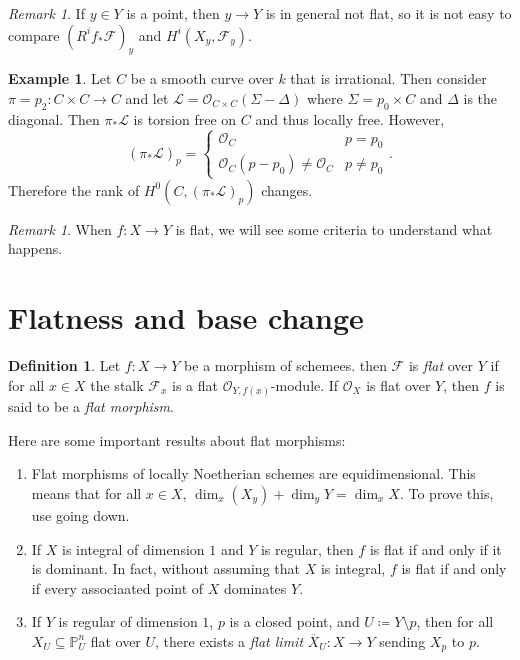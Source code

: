 \documentclass[leqno, openany]{memoir}
\theoremstyle{definition}
\newtheorem{defn}[thm]{Definition}
\newtheorem{exm}[thm]{Example}
\theoremstyle{remark}
\newtheorem{rmk}[thm]{Remark}
\theoremstyle{plain}
\theoremstyle{definition}
\theoremstyle{remark}
\renewcommand{\P}{\mathbb{P}}
\newcommand{\mc}[1]{\mathcal{#1}}
\newcommand{\ol}[1]{\overline{#1}}
\begin{document}
\begin{rmk}
    If $y \in Y$ is a point, then $y \to Y$ is in general not flat, so it is not easy to compare ${(R^i f_* \mc{F})}_y$ and $H^i(X_y, \mc{F}_y)$.
\end{rmk}

\begin{exm}
    Let $C$ be a smooth curve over $k$ that is irrational. Then consider $\pi = p_2 \colon C \times C \to C$ and let $\mc{L} = \mc{O}_{C \times C}(\Sigma - \Delta)$ where $\Sigma = p_0 \times C$ and $\Delta$ is the diagonal. Then $\pi_* \mc{L}$ is torsion free on $C$ and thus locally free. However, 
    \[ { ( \pi_* \mc{L} ) }_p = \begin{cases}
        \mc{O}_C & p = p_0 \\
        \mc{O}_C(p-p_0) \neq \mc{O}_C & p \neq p_0
    \end{cases}. \]
    Therefore the rank of $H^0(C, { ( \pi_* \mc{L} ) }_p)$ changes.
\end{exm}

\begin{rmk}
    When $f \colon X \to Y$ is flat, we will see some criteria to understand what happens.
\end{rmk}

\section{Flatness and base change}%
\label{sec:flatness_and_base_change}

\begin{defn}
    Let $f \colon X \to Y$ be a morphism of schemees. then $\mc{F}$ is \textit{flat} over $Y$ if for all $x \in X$ the stalk $\mc{F}_x$ is a flat $\mc{O}_{Y, f(x)}$-module. If $\mc{O}_X$ is flat over $Y$, then $f$ is said to be a \textit{flat morphism}. 
\end{defn}

Here are some important results about flat morphisms:
\begin{enumerate}
    \item Flat morphisms of locally Noetherian schemes are equidimensional. This means that for all $x \in X$, $\dim_x (X_y) + \dim_y Y = \dim_x X$. To prove this, use going down.
    \item If $X$ is integral of dimension $1$ and $Y$ is regular, then $f$ is flat if and only if it is dominant. In fact, without assuming that $X$ is integral, $f$ is flat if and only if every associaated point of $X$ dominates $Y$.
    \item If $Y$ is regular of dimension $1$, $p$ is a closed point, and $U \coloneqq Y \setminus p$, then for all $X_U \subseteq \P^n_U$ flat over $U$, there exists a \textit{flat limit} $\ol{X}_U \colon X \to Y$ sending $X_p$ to $p$.
\end{enumerate}
\end{document}
